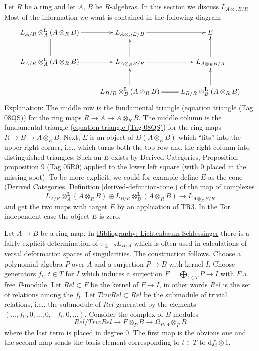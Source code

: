 \documentclass{amsart}
\theoremstyle{plain}
\theoremstyle{definition}
\theoremstyle{remark}
\numberwithin{equation}{subsection}
\begin{document}
\noindent
Let $R$ be a ring and let $A$, $B$ be $R$-algebras. In this section we
discuss $L_{A \otimes_R B/R}$. Most of the information we want is contained
in the following diagram
\begin{equation}
\label{equation-tensor-product}
\vcenter{
\xymatrix{
L_{A/R} \otimes_A^\mathbf{L} (A \otimes_R B) \ar[r] &
L_{A \otimes_R B/B} \ar[r] &
E \\
L_{A/R} \otimes_A^\mathbf{L} (A \otimes_R B) \ar[r] \ar@{=}[u] &
L_{A \otimes_R B/R} \ar[r] \ar[u] &
L_{A \otimes_R B/A} \ar[u] \\
 &
L_{B/R} \otimes_B^\mathbf{L} (A \otimes_R B) \ar[u] \ar@{=}[r] &
L_{B/R} \otimes_B^\mathbf{L} (A \otimes_R B) \ar[u]
}
}
\end{equation}
Explanation: The middle row is the fundamental triangle
(\href{https://stacks.math.columbia.edu/tag/08QS}{equation triangle (Tag 08QS)}) for the ring maps $R \to A \to A \otimes_R B$.
The middle column is the fundamental triangle
(\href{https://stacks.math.columbia.edu/tag/08QS}{equation triangle (Tag 08QS)}) for the ring maps $R \to B \to A \otimes_R B$.
Next, $E$ is an object of $D(A \otimes_R B)$ which ``fits'' into the
upper right corner, i.e., which turns both the top row
and the right column into distinguished triangles. Such an $E$
exists by Derived Categories, Proposition \href{https://stacks.math.columbia.edu/tag/05R0}{proposition 9 (Tag 05R0)}
applied to the lower left square (with $0$ placed in the missing
spot). To be more explicit, we could for example define $E$ as the cone
(Derived Categories, Definition \ref{derived-definition-cone})
of the map of complexes
$$
L_{A/R} \otimes_A^\mathbf{L} (A \otimes_R B) \oplus
L_{B/R} \otimes_B^\mathbf{L} (A \otimes_R B)
\longrightarrow
L_{A \otimes_R B/R}
$$
and get the two maps with target $E$ by an application of TR3.
In the Tor independent case the object $E$ is zero.

\noindent
Let $A \to B$ be a ring map. In \href{https://stacks.math.columbia.edu/bibliography}{Bibliography: Lichtenbaum-Schlessinger}
there is a fairly explicit determination of $\tau_{\geq -2}L_{B/A}$
which is often used in calculations of versal deformation spaces of
singularities. The construction follows.
Choose a polynomial algebra $P$ over $A$
and a surjection $P \to B$ with kernel $I$. Choose generators
$f_t$, $t \in T$ for $I$ which induces a surjection
$F = \bigoplus_{t \in T} P \to I$ with $F$ a free $P$-module.
Let $Rel \subset F$ be the kernel of $F \to I$, in other words
$Rel$ is the set of relations among the $f_t$. Let $TrivRel \subset Rel$
be the submodule of trivial relations, i.e., the submodule of $Rel$
generated by the elements $(\ldots, f_{t'}, 0, \ldots, 0, -f_t, 0, \ldots)$.
Consider the complex of $B$-modules
\begin{equation}
\label{equation-lichtenbaum-schlessinger}
Rel/TrivRel \longrightarrow
F \otimes_P B \longrightarrow
\Omega_{P/A} \otimes_P B
\end{equation}
where the last term is placed in degree $0$. The first map is the obvious
one and the second map sends the basis element corresponding to $t \in T$
to $\text{d}f_t \otimes 1$.
\end{document}
